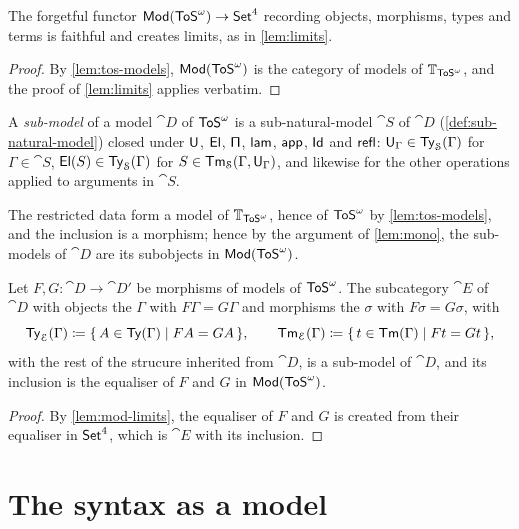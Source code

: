 \begin{lemma}\label{lem:mod-limits}
    The forgetful functor $\mathsf{Mod}(\mathsf{ToS}^\omega) \to \mathsf{Set}^4$ recording objects, morphisms, types and terms is faithful and creates limits, as in \cref{lem:limits}.
\end{lemma}

\begin{proof}
    By \cref{lem:tos-models}, $\mathsf{Mod}(\mathsf{ToS}^\omega)$ is the category of models of $\mathbb{T}_{\mathsf{ToS}^\omega}$, and the proof of \cref{lem:limits} applies verbatim.
\end{proof}

\begin{definition}\label{def:sub-model}
    A \emph{sub-model} of a model $\cat{D}$ of $\mathsf{ToS}^\omega$ is a sub-natural-model $\cat{S}$ of $\cat{D}$ (\cref{def:sub-natural-model}) closed under $\mathsf{U}$, $\mathsf{El}$, $\mathsf{\Pi}$, $\mathsf{lam}$, $\mathsf{app}$, $\mathsf{Id}$ and $\mathsf{refl}$: $\mathsf{U}_\Gamma \in \mathsf{Ty}_{\mathcal{S}}(\Gamma)$ for $\Gamma \in \cat{S}$, $\mathsf{El}(S) \in \mathsf{Ty}_{\mathcal{S}}(\Gamma)$ for $S \in \mathsf{Tm}_{\mathcal{S}}(\Gamma, \mathsf{U}_\Gamma)$, and likewise for the other operations applied to arguments in $\cat{S}$.
\end{definition}

The restricted data form a model of $\mathbb{T}_{\mathsf{ToS}^\omega}$, hence of $\mathsf{ToS}^\omega$ by \cref{lem:tos-models}, and the inclusion is a morphism; hence by the argument of \cref{lem:mono}, the sub-models of $\cat{D}$ are its subobjects in $\mathsf{Mod}(\mathsf{ToS}^\omega)$.

\begin{lemma}\label{lem:equaliser}
    Let $F, G : \cat{D} \to \cat{D}'$ be morphisms of models of $\mathsf{ToS}^\omega$. The subcategory $\cat{E}$ of $\cat{D}$ with objects the $\Gamma$ with $F\Gamma = G\Gamma$ and morphisms the $\sigma$ with $F\sigma = G\sigma$, with
    \[
        \mathsf{Ty}_{\mathcal{E}}(\Gamma) \coloneqq \{\, A \in \mathsf{Ty}(\Gamma) \mid FA = GA \,\}, \qquad \mathsf{Tm}_{\mathcal{E}}(\Gamma) \coloneqq \{\, t \in \mathsf{Tm}(\Gamma) \mid Ft = Gt \,\},
    \]
    with the rest of the strucure inherited from $\cat{D}$, is a sub-model of $\cat{D}$, and its inclusion is the equaliser of $F$ and $G$ in $\mathsf{Mod}(\mathsf{ToS}^\omega)$.
\end{lemma}

\begin{proof}
    By \cref{lem:mod-limits}, the equaliser of $F$ and $G$ is created from their equaliser in $\mathsf{Set}^4$, which is $\cat{E}$ with its inclusion.
\end{proof}

\section{The syntax as a model}
\label{sec:syntax-model}

